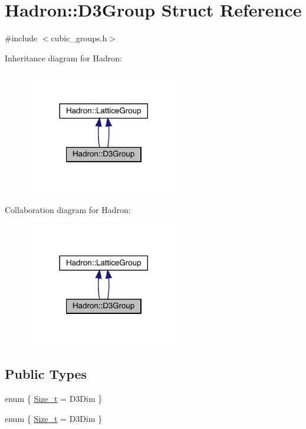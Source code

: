 \hypertarget{structHadron_1_1D3Group}{}\section{Hadron\+:\+:D3\+Group Struct Reference}
\label{structHadron_1_1D3Group}


{\ttfamily \#include $<$cubic\+\_\+groups.\+h$>$}



Inheritance diagram for Hadron\+:\nopagebreak
\begin{figure}[H]
\begin{center}
\leavevmode
\includegraphics[width=192pt]{d3/d27/structHadron_1_1D3Group__inherit__graph}
\end{center}
\end{figure}


Collaboration diagram for Hadron\+:\nopagebreak
\begin{figure}[H]
\begin{center}
\leavevmode
\includegraphics[width=192pt]{db/d1a/structHadron_1_1D3Group__coll__graph}
\end{center}
\end{figure}
\subsection*{Public Types}
\begin{DoxyCompactItemize}
\item 
enum \{ \mbox{\hyperlink{structHadron_1_1D3Group_a3bbe7d96ebbf4cdbf5eb8bb7ec738a29aa23dfbcefd441f0213ae42d08417ae76}{Size\+\_\+t}} = D3\+Dim
 \}
\item 
enum \{ \mbox{\hyperlink{structHadron_1_1D3Group_a3bbe7d96ebbf4cdbf5eb8bb7ec738a29aa23dfbcefd441f0213ae42d08417ae76}{Size\+\_\+t}} = D3\+Dim
 \}
\end{DoxyCompactItemize}
